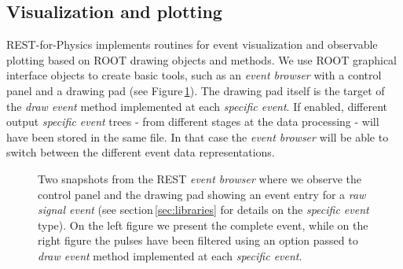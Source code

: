 \subsection{Visualization and plotting}


REST-for-Physics implements routines for event visualization and observable plotting based on ROOT drawing objects and methods. We use ROOT graphical interface objects to create basic tools, such as an \emph{event browser} with a control panel and a drawing pad (see Figure\,\ref{fig:eventBrowser}). The drawing pad itself is the target of the \emph{draw event} method implemented at each \emph{specific event}. If enabled, different output \emph{specific event} trees - from different stages at the data processing - will have been stored in the same file. In that case the \emph{event browser} will be able to switch between the different event data representations.

\begin{figure}[h]
  \centering
	\caption{Two snapshots from the REST \emph{event browser} where we observe the control panel and the drawing pad showing an event entry for a \emph{raw signal event} (see section\,\ref{sec:libraries} for details on the \emph{specific event} type). On the left figure we present the complete event, while on the right figure the pulses have been filtered using an option passed to \emph{draw event} method implemented at each \emph{specific event}.}\label{fig:eventBrowser}
\end{figure}

